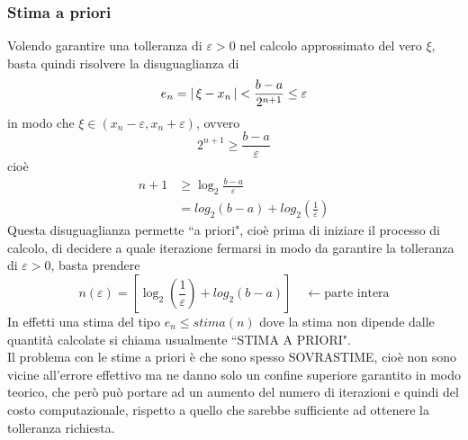 \subsubsection{Stima a priori}
Volendo garantire una tolleranza di $\varepsilon > 0 $ nel calcolo approssimato del vero $\xi$, basta quindi risolvere la disuguaglianza di 
\[ e_n = \lvert\,\xi - x_n\,\rvert < \frac{b-a}{2^{n+1}} \le \varepsilon \]
in modo che $\xi \in (x_n -  \varepsilon, x_n + \varepsilon)$, ovvero \[ 2^{n+1} \geq  \frac{b-a}{\varepsilon} \]
cioè
\[\begin{split}
   n + 1 & \ge \log_2{\frac{b-a}{\varepsilon}} \\
    & = log_2\left(b-a\right) + log_2\left(\frac{1}{\varepsilon}\right)
\end{split}\]
Questa disuguaglianza permette ``a priori", cioè prima di iniziare il processo di calcolo, di decidere a quale iterazione fermarsi in modo da garantire la tolleranza di $\varepsilon > 0$, basta prendere 
\[ n(\varepsilon) = [\log_2\left(\frac{1}{\varepsilon}\right) + log_2{(b-a)}] \quad \leftarrow \text{parte intera}\]
In effetti una stima del tipo $e_n \leq stima(n)$ dove la stima non dipende dalle quantità calcolate si chiama usualmente ``STIMA A PRIORI".\\
Il problema con le stime a priori è che sono spesso SOVRASTIME, cioè non sono vicine all'errore effettivo ma ne danno solo un confine superiore garantito in modo teorico, che però può portare ad un aumento del numero di iterazioni e quindi del costo computazionale, rispetto a quello che sarebbe sufficiente ad ottenere la tolleranza richiesta.

